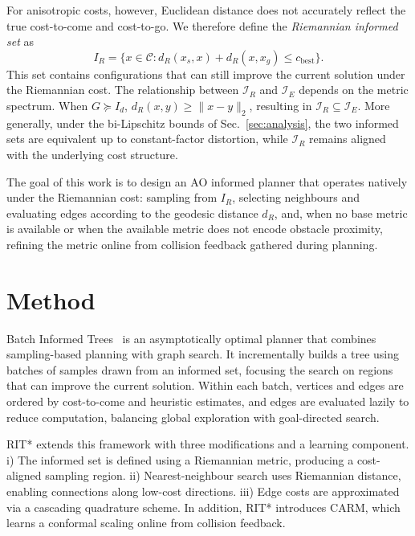 \documentclass[journal]{IEEEtran}
\newcommand{\rev}[1]{#1}%
\newcommand{\Cspace}{\mathcal{C}}
\newcommand{\IR}{I_{\!R}}
\newcommand{\dR}{d_{\!R}}
\begin{document}
For anisotropic costs, however, Euclidean distance does not accurately
reflect the true cost-to-come and cost-to-go. We therefore define the
\emph{Riemannian informed set} as
\begin{equation}\label{eq:IR}
  \IR = \bigl\{ x \in \Cspace : \dR(x_s, x) + \dR(x, x_g) \le c_{\mathrm{best}} \bigr\}.
\end{equation}
This set contains configurations that can still improve the current solution under the Riemannian cost. \rev{The relationship between $\mathcal{I}_R$ and $\mathcal{I}_E$ depends on the metric spectrum. When $G \succeq I_d$, $d_R(x,y)\ge \|x-y\|_2$, resulting in $\mathcal{I}_R \subseteq \mathcal{I}_E$. More generally, under the bi-Lipschitz bounds of Sec.~\ref{sec:analysis}, the two informed sets are equivalent up to constant-factor distortion, while $\mathcal{I}_R$ remains aligned with the underlying cost structure.}

The goal of this work is to design an AO informed planner that operates natively under the Riemannian cost: sampling from $I_R$, selecting neighbours and evaluating edges according to the geodesic distance $d_R$, and, when no base metric is available or when the available metric does not encode obstacle proximity, refining the metric online from collision feedback gathered during planning.


\section{Method}\label{sec:method}
Batch Informed Trees~\cite{Gammell2020} is an asymptotically optimal planner that combines sampling-based planning with graph search. It incrementally builds a tree using batches of samples drawn from an informed set, focusing the search on regions that can improve the current solution. Within each batch, vertices and edges are ordered by cost-to-come and heuristic estimates, and edges are evaluated lazily to reduce computation, balancing global exploration with goal-directed search.

RIT* extends this framework with three modifications and a learning component. i) The informed set is defined using a Riemannian metric, producing a cost-aligned sampling region. ii) Nearest-neighbour search uses Riemannian distance, enabling connections along low-cost directions. iii) Edge costs are approximated via a cascading quadrature scheme. In addition, RIT* introduces CARM, which \rev{learns a conformal scaling} online from collision feedback.
\end{document}
